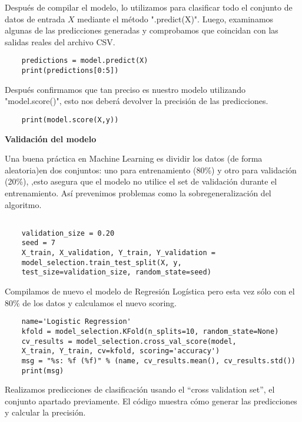 \documentclass{pssbmac}
\begin{document}
Después de compilar el modelo, lo utilizamos para clasificar todo el conjunto de datos de entrada \(X\)  mediante el método ".predict(X)". Luego, examinamos algunas de las predicciones generadas y comprobamos que coincidan con las salidas reales del archivo CSV.
\begin{lstlisting}
    predictions = model.predict(X)
    print(predictions[0:5])

\end{lstlisting}


Después confirmamos que tan preciso es nuestro modelo utilizando "model.score()", esto nos deberá devolver la precisión de las predicciones.
\begin{lstlisting}
    print(model.score(X,y))
\end{lstlisting}



\vspace{.3cm}

\textbf{Validación del modelo}



Una buena práctica en Machine Learning es dividir los datos (de forma aleatoria)en dos conjuntos: uno para entrenamiento (80\%) y otro para validación (20\%), ,esto asegura que el modelo no utilice el set de validación durante el entrenamiento. Así prevenimos problemas como la sobregeneralización del algoritmo.
\begin{lstlisting}
    
    validation_size = 0.20
    seed = 7
    X_train, X_validation, Y_train, Y_validation = 
    model_selection.train_test_split(X, y, 
    test_size=validation_size, random_state=seed)
\end{lstlisting}

Compilamos de nuevo el modelo de Regresión Logística pero esta vez sólo con el 80\% de los datos y calculamos el nuevo scoring.
\begin{lstlisting}
    name='Logistic Regression'
    kfold = model_selection.KFold(n_splits=10, random_state=None)
    cv_results = model_selection.cross_val_score(model, 
    X_train, Y_train, cv=kfold, scoring='accuracy')
    msg = "%s: %f (%f)" % (name, cv_results.mean(), cv_results.std())
    print(msg)
\end{lstlisting}

Realizamos predicciones de clasificación usando el ``cross validation set'', el conjunto apartado previamente. El código muestra cómo generar las predicciones y calcular la precisión.
\end{document}
